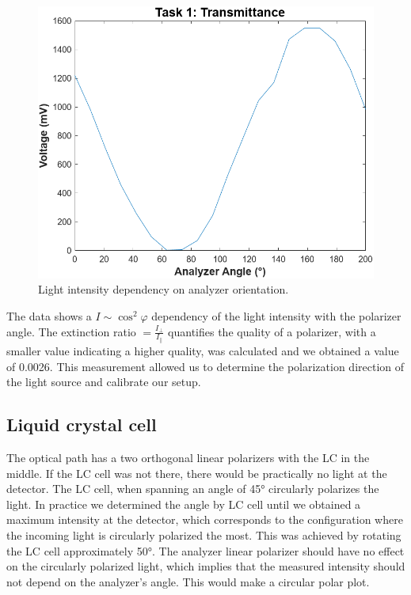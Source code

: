 \documentclass[12pt,a4paper]{article}
\begin{document}
\begin{figure} [H]
    \centering
    \includegraphics[width=0.6\linewidth]{figs/task1_transmittance.png}
    \caption{Light intensity dependency on analyzer orientation.}
    \label{fig:t1}
\end{figure}

The data shows a $I \sim \cos^2\varphi$ dependency of the light intensity with the polarizer angle. The extinction ratio $= \frac{I_\perp}{I_\parallel}$ quantifies the quality of a polarizer, with a smaller value indicating a higher quality, was calculated and we obtained a value of 0.0026. This measurement allowed us to determine the polarization direction of the light source and calibrate our setup.

\subsection{Liquid crystal cell}

 The optical path has a two orthogonal linear polarizers with the LC in the middle. If the LC cell was not there, there would be practically no light at the detector. The LC cell, when spanning an angle of 45° circularly polarizes the light. In practice we determined the angle by LC cell until we obtained a maximum intensity at the detector, which corresponds to the configuration where the incoming light is circularly polarized the most. This was achieved by rotating the LC cell approximately 50°. The analyzer linear polarizer should have no effect on the circularly polarized light, which implies that the measured intensity should not depend on the analyzer's angle. This would make a circular polar plot.
\end{document}

